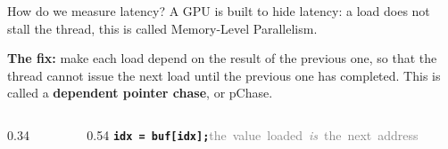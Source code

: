 \documentclass[aspectratio=169, numbering=fraction]{beamer}
\begin{document}
\begin{frame}{How do we measure latency?}
  \vspace{0.2em}
  \footnotesize
  A GPU is built to hide latency: a load does not stall the thread, this is called Memory-Level Parallelism.
  
  \textbf{The fix:} make each load depend on the result of the previous one, so that the thread cannot issue the next load until the previous one has completed. This is called a \textbf{dependent pointer chase}, or pChase.

  \vspace{1.5em}
  \begin{columns}[c]
    \begin{column}{0.34\textwidth}
      \centering
    \end{column}
    \begin{column}{0.54\textwidth}
      \centering
      \mbox{\texttt{\textbf{idx = buf[idx];}}\quad\textcolor{gray}{\scriptsize the value loaded \emph{is} the next address}}


\end{column}
\end{columns}
\end{frame}
\end{document}
